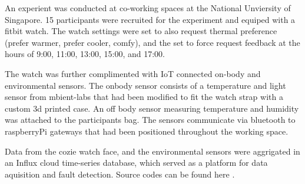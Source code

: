 
An experient was conducted at co-working spaces at the National Unviersity of Singapore. 15 participants were recruited for the experiment and equiped with a fitbit watch. The watch settings were set to also request thermal preference (prefer warmer, prefer cooler, comfy), and the set to force request feedback at the hours of 9:00, 11:00, 13:00, 15:00, and 17:00. 

The watch was further complimented with IoT connected on-body and environmental sensors. The onbody sensor consists of a temperature and light sensor from mbient-labs that had been modified to fit the watch strap with a custom 3d printed case. An off body sensor measuring temperature and humidity was attached to the participants bag. The sensors communicate via bluetooth to raspberryPi gateways that had been positioned throughout the working space. 

Data from the cozie watch face, and the environmental sensors were aggrigated in an Influx cloud time-series database, which served as a platform for data aquisition and fault detection. Source codes can be found here \cite{aurek-data}.



